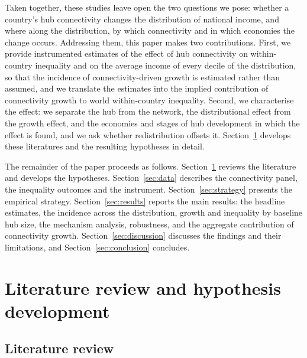 Taken together, these studies leave open the two questions we pose: whether a country's hub connectivity changes the distribution of national income, and where along the distribution, by which connectivity and in which economies the change occurs. Addressing them, this paper makes two contributions. First, we provide instrumented estimates of the effect of hub connectivity on within-country inequality and on the average income of every decile of the distribution, so that the incidence of connectivity-driven growth is estimated rather than assumed, and we translate the estimates into the implied contribution of connectivity growth to world within-country inequality. Second, we characterise the effect: we separate the hub from the network, the distributional effect from the growth effect, and the economies and stages of hub development in which the effect is found, and we ask whether redistribution offsets it. Section~\ref{sec:literature} develops these literatures and the resulting hypotheses in detail.

The remainder of the paper proceeds as follows. Section~\ref{sec:literature} reviews the literature and develops the hypotheses. Section~\ref{sec:data} describes the connectivity panel, the inequality outcomes and the instrument. Section~\ref{sec:strategy} presents the empirical strategy. Section~\ref{sec:results} reports the main results: the headline estimates, the incidence across the distribution, growth and inequality by baseline hub size, the mechanism analysis, robustness, and the aggregate contribution of connectivity growth. Section~\ref{sec:discussion} discusses the findings and their limitations, and Section~\ref{sec:conclusion} concludes.

\section{Literature review and hypothesis development}
\label{sec:literature}
\subsection{Literature review}
\label{sec:litreview}
